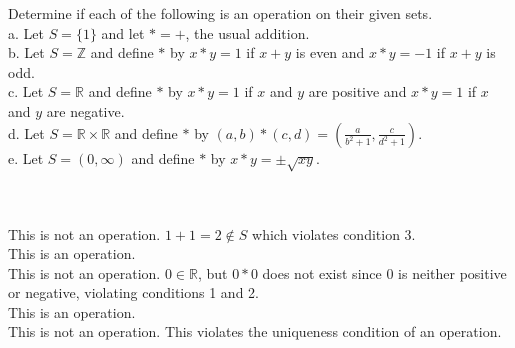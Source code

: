 Determine if each of the following is an operation on their given sets.\\

a. Let $S=\{1\}$ and let $*=+$, the usual addition.\\

b. Let $S=\mathbb{Z}$ and define $*$ by $x*y=1$ if $x+y$ is even and $x*y=-1$ if $x+y$ is odd.\\

c. Let $S=\mathbb{R}$ and define $*$ by $x*y=1$ if $x$ and $y$ are positive and $x*y=1$ if $x$ and $y$
are negative.\\

d. Let $S=\mathbb{R}\times\mathbb{R}$ and define $*$ by
$(a,b)*(c,d)=(\frac{a}{b^2+1},\frac{c}{d^2+1})$.\\

e. Let $S=(0,\infty)$ and define $*$ by $x*y=\pm\sqrt{xy}$.\\\\

\begin{solution}\renewcommand{\qedsymbol}{}\ \\
    This is not an operation. $1+1=2\notin S$ which violates condition 3.\\

    This is an operation.\\

    This is not an operation. $0\in\mathbb{R}$, but $0*0$ does not exist since 0 is neither positive or
    negative, violating conditions 1 and 2.\\

    This is an operation.\\

    This is not an operation. This violates the uniqueness condition of an operation.

\end{solution}